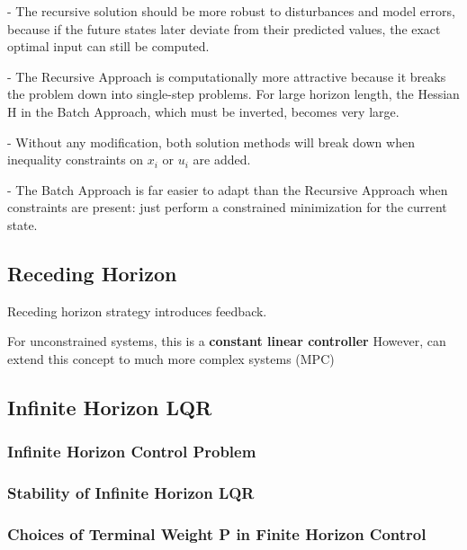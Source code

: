 - The recursive solution should be more robust to disturbances and model
errors, because if the future states later deviate from their predicted
values, the exact optimal input can still be computed.

- The Recursive Approach is computationally more attractive because it
breaks the problem down into single-step problems. For large horizon
length, the Hessian H in the Batch Approach, which must be inverted,
becomes very large.

- Without any modification, both solution methods will break down when
inequality constraints on $x_i$ or $u_i$ are added.

- The Batch Approach is far easier to adapt than the Recursive Approach
when constraints are present: just perform a constrained minimization for
the current state.

\subsection{Receding Horizon}

Receding horizon strategy introduces feedback.


For unconstrained systems, this is a \textbf{constant linear controller}
However, can extend this concept to much more complex systems (MPC)


\subsection{Infinite Horizon LQR}

\subsubsection{Infinite Horizon Control Problem}


\subsubsection{Stability of Infinite Horizon LQR}


\subsubsection{Choices of Terminal Weight P in Finite Horizon Control}

